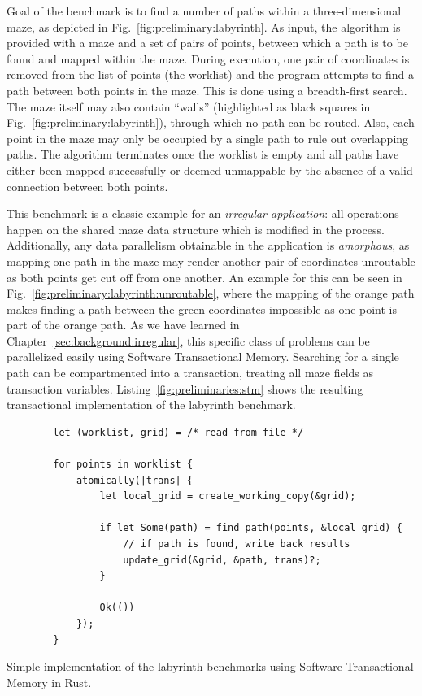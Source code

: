 Goal of the benchmark is to find a number of paths within a three-dimensional maze, as depicted in Fig.~\ref{fig:preliminary:labyrinth}.
As input, the algorithm is provided with a maze and a set of pairs of points, between which a path is to be found and mapped within the maze.
During execution, one pair of coordinates is removed from the list of points (the worklist) and the program attempts to find a path between both points in the maze.
This is done using a breadth-first search.
The maze itself may also contain \enquote{walls} (highlighted as black squares in Fig.~\ref{fig:preliminary:labyrinth}), through which no path can be routed.
Also, each point in the maze may only be occupied by a single path to rule out overlapping paths.
The algorithm terminates once the worklist is empty and all paths have either been mapped successfully or deemed unmappable by the absence of a valid connection between both points.

This benchmark is a classic example for an \emph{irregular application}: all operations happen on the shared maze data structure which is modified in the process.
Additionally, any data parallelism obtainable in the application is \emph{amorphous}, as mapping one path in the maze may render another pair of coordinates unroutable as both points get cut off from one another.
An example for this can be seen in Fig.~\ref{fig:preliminary:labyrinth:unroutable}, where the mapping of the orange path makes finding a path between the green coordinates impossible as one point is part of the orange path.
As we have learned in Chapter~\ref{sec:background:irregular}, this specific class of problems can be parallelized easily using Software Transactional Memory.
Searching for a single path can be compartmented into a transaction, treating all maze fields as transaction variables.
Listing~\ref{fig:preliminaries:stm} shows the resulting transactional implementation of the labyrinth benchmark.

\begin{listing}[t]
    \begin{verbatim}
        let (worklist, grid) = /* read from file */

        for points in worklist {
            atomically(|trans| {
                let local_grid = create_working_copy(&grid);

                if let Some(path) = find_path(points, &local_grid) {
                    // if path is found, write back results
                    update_grid(&grid, &path, trans)?;
                }

                Ok(())
            });
        }
    \end{verbatim}
    \caption{Simple implementation of the labyrinth benchmarks using Software Transactional Memory in Rust.}%
    \label{fig:preliminaries:stm}
\end{listing}

